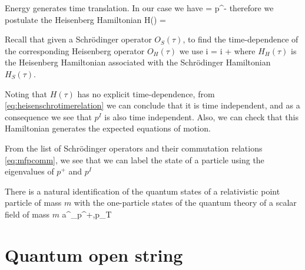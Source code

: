 \documentclass[oneside, 12pt]{book}
\begin{document}
Energy generates time translation. In our case we have
\beq[eq:deltaudelx+] \pdv{\tau} =  \longleftrightarrow {}p^{-} \eeq
therefore we postulate the Heisenberg Hamiltonian
\beq[] H(\tau) =  \eeq

Recall that given a Schrödinger operator \(O_S(\tau)\), to find the time-dependence of the corresponding Heisenberg operator \(O_H(\tau)\) we use
\beq[eq:heisenschrotimerelation] i = i +  \eeq
where \(H_H(\tau)\) is the Heisenberg Hamiltonian associated with the Schrödinger Hamiltonian \(H_S(\tau)\).\par 
Noting that \(H(\tau)\) has no explicit time-dependence, from \eqref{eq:heisenschrotimerelation} we can conclude that it is time independent, and as a consequence we see that \(p^I\) is also time independent. Also, we can check that this Hamiltonian generates the expected equations of motion.\par 
From the list of Schrödinger operators and their commutation relations \eqref{eq:mfpcomm}, we see that we can label the state of a particle using the eigenvalues of \(p^{+}\) and \(p^I\)
\beq[]  \eeq

There is a natural identification of the quantum states of a relativistic point particle of mass \(m\) with the one-particle states of the quantum theory of a scalar field of mass \(m\)
\beq[]  \longleftrightarrow a^{\dag}_{p^{+},p_T}\ket{\Omega} \eeq

\section{Quantum open string}
\end{document}
